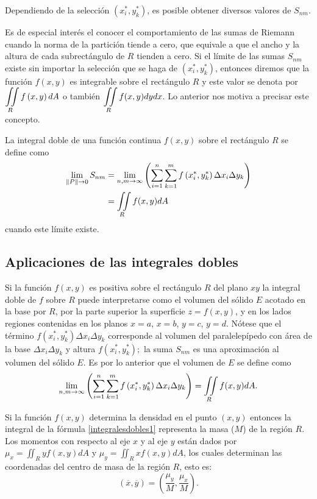 Dependiendo de la selección $\left( x_{i}^{\ast },y_{k}^{\ast }\right) $,
es posible obtener diversos valores de $S_{nm}$.

Es de especial interés el conocer el comportamiento de las sumas de
Riemann cuando la norma de la partición tiende a cero, que equivale a
que el ancho y la altura de cada subrectángulo de $R$ tienden a cero.
Si el límite de las sumas $S_{nm}$ existe sin importar la selección
que se haga de $\left( x_{i}^{\ast },y_{k}^{\ast }\right) $, entonces
diremos que la función $f(x,y) $ es integrable sobre el rectángulo $R$
y este valor se denota por
$\displaystyle \iint\limits_{R}f\left(x,y\right) dA$ o también $\displaystyle \iint\limits_{R}f(x,y) dydx$.
Lo anterior nos motiva a precisar este concepto.

\begin{defi}
La integral doble de una función continua $f(x,y)$ sobre el rectángulo $R$ se define como
\begin{align}
\lim _{\left\Vert P\right\Vert \to 0} S_{nm} &= \lim _{n,m \to \infty}\left(\sum_{i=1}^{n}\sum_{k=1}^{m}f\left( x_{i}^{\ast },y_{k}^{\ast}\right) \Delta x_{i}\Delta y_{k}\right) \nonumber \\
&= \displaystyle \iint\limits_{R}f(x,y) dA \label{integralesdobles1}
\end{align}
cuando este límite existe.
\end{defi}

\subsection{Aplicaciones de las integrales dobles}

Si la función $f(x,y)$ es positiva sobre el rectángulo $R$ del plano $xy$ la integral doble de $f$ sobre $R$ puede
interpretarse como el volumen del sólido $E$ acotado en la base por $R$,
por la parte superior la superficie $z=f(x,y)$, y en los lados regiones contenidas en
los planos $x=a$, $x=b$, $y=c$, $y=d$. Nótese que el término
$f(x_{i}^{\ast },y_{k}^{\ast })\Delta x_{i}\Delta y_{k}$ corresponde al
volumen del paralelepípedo con área de la base $\Delta x_{i}\Delta y_{k}$ y altura $f(x_{i}^{\ast },y_{k}^{\ast });$
la suma $S_{nm}$ es una aproximación al volumen del sólido $E$.
Es por lo anterior que el volumen de $E$ se define como
\[\lim_{n,m \to \infty}\left(\sum_{i=1}^{n}\sum_{k=1}^{m}f\left( x_{i}^{\ast },y_{k}^{\ast}\right) \Delta x_{i}\Delta y_{k}\right)= \displaystyle \iint\limits_{R}f(x,y) dA.\]

Si la función $f(x,y)$ determina la densidad en el punto $(x,y)$ entonces la integral de la fórmula \ref{integralesdobles1}
representa la masa ($M$) de la región $R$. Los momentos con respecto al eje $x$ y al eje $y$ están dados  por
$\mu_{x}= \iint_R y f(x,y)dA$ y $\mu_{y}= \iint_R x f(x,y)dA$, los cuales determinan las coordenadas del
centro de masa de la región $R$, esto es:
\[(\overline{x},\overline{y})= \left(\frac{\mu_y}{M},\frac{\mu_x}{M}\right).\]


